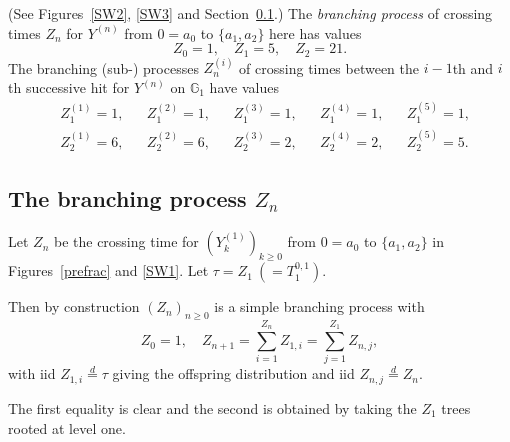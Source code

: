 \documentclass[a4paper]{amsart}
\theoremstyle{plain}
\theoremstyle{definition}
\theoremstyle{remark}
\begin{document}
(See Figures~\ref{SW2},  \ref{SW3} and Section~\ref{secbp}.) The \emph{branching process} of crossing times $ Z_n $ for $ Y^{(n)} $  from $ 0 = a_0 $ to $ \{a_1,a_2\} $ here has values
\[  Z_0 = 1, \quad Z_1 = 5, \quad Z_2 = 21.\]
The branching (sub-) processes $ Z_n^{(i)} $ of crossing times between  the $ i\!-\!1$th and $ i $th successive hit for $ Y^{(n)} $ on $ \mathbb{G}_1 $ have values 
\begin{align*}
& Z_1^{(1)} = 1, &&  Z_1^{(2)} = 1, &&  Z_1^{(3)} = 1, &&  Z_1^{(4)} = 1, && Z_1^{(5)} = 1, \\
&   Z_2^{(1)} = 6, &&  Z_2^{(2)} = 6, &&  Z_2^{(3)} = 2, &&  Z_2^{(4)} = 2, && Z_2^{(5)} =5.
\end{align*} 






\subsection{The branching process $ Z_n $}\label{secbp}
Let $ Z_n $ be the crossing time for $ (Y^{(1)}_k)_{k\geq 0 } $ from $ 0 = a_0 $ to $ \{a_1,a_2\} $ in Figures~\ref{prefrac} and \ref{SW1}.
Let $ \tau = Z_1 \ (= T_1^{0,1}) $. 
 
 Then by construction $ (Z_n)_{n\geq 0} $ is a simple branching process with 
\begin{equation} \label{}
Z_0 = 1, \quad Z_{n+1} = \sum_{i=1}^{Z_n}Z_{1,i} =  \sum_{j=1}^{Z_1}Z_{n,j},
\end{equation} 
with iid  $Z_{1,i}   \overset{d}{=} \tau $ giving the offspring distribution and iid $ Z_{n,j}
 \overset{d}{=} Z_n$.
 
 The first equality is clear and the second is obtained by taking the $ Z_1 $ trees rooted at level one.

 

\end{document}
